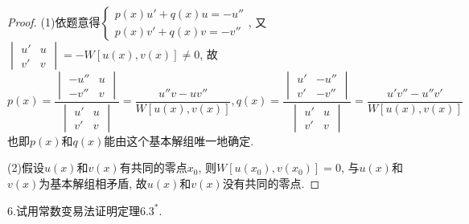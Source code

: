 \begin{proof}
(1)依题意得$\begin{cases}p(x)u'+q(x)u=-u''\\p(x)v'+q(x)v=-v''\end{cases}$, 
又$\begin{vmatrix}u'&u\\v'&v\end{vmatrix}=-W[u(x),v(x)]\neq0$, 故
\[p(x)=\frac{\begin{vmatrix}-u''&u\\-v''&v\end{vmatrix}}{\begin{vmatrix}u'&u\\v'&v\end{vmatrix}}=\frac{u''v-uv''}{W[u(x),v(x)]},q(x)=\frac{\begin{vmatrix}u'&-u''\\v'&-v''\end{vmatrix}}{\begin{vmatrix}u'&u\\v'&v\end{vmatrix}}=\frac{u'v''-u''v'}{W[u(x),v(x)]}\]
也即$p(x)$和$q(x)$能由这个基本解组唯一地确定.

(2)假设$u(x)$和$v(x)$有共同的零点$x_0$, 则$W[u(x_0),v(x_0)]=0$, 与$u(x)$和$v(x)$为基本解组相矛盾, 故$u(x)$和$v(x)$没有共同的零点.
\end{proof}


6.试用常数变易法证明定理$6.3^*$.

